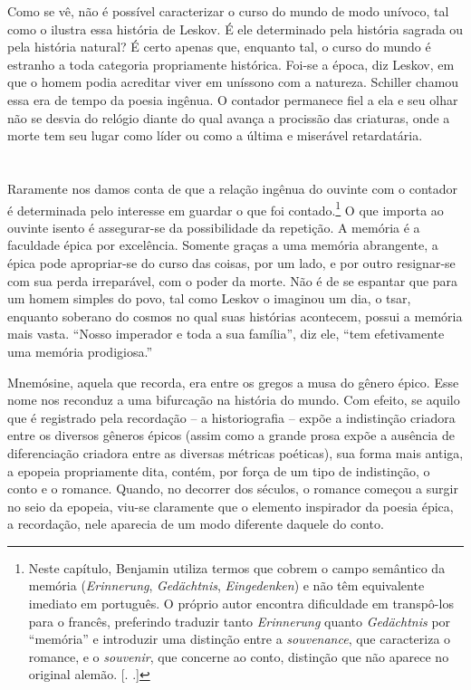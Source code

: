 Como se vê, não é possível caracterizar o curso do mundo de modo
unívoco, tal como o ilustra essa história de Leskov. É ele determinado
pela história sagrada ou pela história natural? É certo apenas que,
enquanto tal, o curso do mundo é estranho a toda categoria propriamente
histórica. Foi-se a época, diz Leskov, em que o homem podia acreditar
viver em uníssono com a natureza. Schiller chamou essa era de tempo da
poesia ingênua. O contador permanece fiel a ela e seu olhar não se
desvia do relógio diante do qual avança a procissão das criaturas, onde
a morte tem seu lugar como líder ou como a última e miserável retardatária.

\section{}

Raramente nos damos conta de que a relação ingênua do ouvinte com o
contador é determinada pelo interesse em guardar o que foi contado.\footnote{Neste capítulo, Benjamin utiliza termos que cobrem o campo
  semântico da memória (\emph{Erinnerung}, \emph{Gedächtnis},
  \emph{Eingedenken}) e não têm equivalente imediato em português. O
  próprio autor encontra dificuldade em transpô-los para o francês,
  preferindo traduzir tanto \emph{Erinnerung} quanto \emph{Gedächtnis}
  por ``memória'' e introduzir uma distinção entre a \emph{souvenance},
  que caracteriza o romance, e o \emph{souvenir}, que concerne ao conto,
  distinção que não aparece no original alemão. [. .]} O
que importa ao ouvinte isento é assegurar-se da possibilidade da
repetição. A memória é a faculdade épica por excelência. Somente graças
a uma memória abrangente, a épica pode apropriar-se do curso das coisas,
por um lado, e por outro resignar-se com sua perda irreparável, com o
poder da morte. Não é de se espantar que para um homem simples do povo,
tal como Leskov o imaginou um dia, o tsar, enquanto soberano do cosmos
no qual suas histórias acontecem, possui a memória mais vasta. ``Nosso
imperador e toda a sua família'', diz ele, ``tem efetivamente uma memória
prodigiosa.''

Mnemósine, aquela que recorda, era entre os gregos a musa do gênero
épico. Esse nome nos reconduz a uma bifurcação na história do mundo. Com
efeito, se aquilo que é registrado pela recordação -- a historiografia
-- expõe a indistinção criadora entre os diversos gêneros épicos (assim
como a grande prosa expõe a ausência de diferenciação criadora entre as
diversas métricas poéticas), sua forma mais antiga, a epopeia
propriamente dita, contém, por força de um tipo de indistinção, o conto
e o romance. Quando, no decorrer dos séculos, o romance começou a surgir
no seio da epopeia, viu-se claramente que o elemento inspirador da
poesia épica, a recordação, nele aparecia de um modo diferente daquele
do conto.

